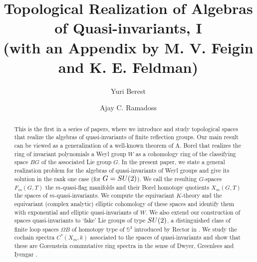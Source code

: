 \documentclass[11pt]{amsart}
\theoremstyle{definition}
\theoremstyle{remark}
\numberwithin{equation}{section}
\def\bS{\mathbb S}
\begin{document}
\title[Topological Realization of Algebras of Quasi-invariants]{Topological Realization of Algebras of Quasi-invariants, I\\
(with an Appendix by M. V. Feigin and K. E. Feldman)}
%
\author{Yuri Berest}
\address{Department of Mathematics,
Cornell University, Ithaca, NY 14853-4201, USA}
%
\author{Ajay C. Ramadoss}
\address{Department of Mathematics,
Indiana University,
Bloomington, IN 47405, USA}
%


%
\begin{abstract}
This is the first in a series of papers, where we introduce and study topological spaces
that realize the algebras of quasi-invariants of finite reflection groups. Our main result can be viewed as a generalization of a well-known theorem of A. Borel
that realizes the ring of invariant polynomials a Weyl group $W$ as a cohomology ring of the classifying space $BG$ of the associated Lie group $G$. In the present paper,
we state a general realization problem for the algebras of quasi-invariants of Weyl groups 
and give its solution in the rank one case (for $G = {\rm SU}(2)$).  We call the resulting $G$-spaces $ F_m(G,T) $ the $m$-quasi-flag manifolds and their Borel
homotopy quotients $ X_m(G,T) $ the spaces of $m$-quasi-invariants. We compute the
equivariant $K$-theory and the equivariant (complex analytic) elliptic cohomology of these spaces and identify them with exponential and elliptic quasi-invariants of $W$. 
We also extend our construction of spaces quasi-invariants to `fake' Lie groups of type ${\rm SU}(2)$, a distinguished class of finite loop spaces  $ \Omega B $ of homotopy type of $ \bS^3 $ introduced by Rector in \cite{Rec71}. We study the cochain spectra $ C^*(X_m, k) $ associated to the spaces of quasi-invariants and show that these are Gorenstein commutative ring spectra in the sense of Dwyer, Greenlees and Iyengar \cite{DGI06}.
\end{abstract}
%
\maketitle


\tableofcontents
\end{document}
